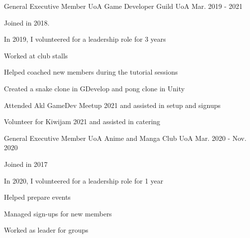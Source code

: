 

\begin{cventries}

  \cventry
    {General Executive Member} %
    {UoA Game Developer Guild} %
    {UoA} %
    {Mar. 2019 - 2021} %
    {
      \begin{cvitems} %
        \item {Joined in 2018.}
        \item {In 2019, I volunteered for a leadership role for 3 years}
        \item {Worked at club stalls}
        \item {Helped coached new members during the tutorial sessions}
        \item {Created a snake clone in GDevelop and pong clone in Unity}
        \item {Attended Akl GameDev Meetup 2021 and assisted in setup and signups}
        \item {Volunteer for Kiwijam 2021 and assisted in catering}
      \end{cvitems}
    }

  \cventry
    {General Executive Member} %
    {UoA Anime and Manga Club} %
    {UoA} %
    {Mar. 2020 - Nov. 2020} %
    {
      \begin{cvitems} %
        \item {Joined in 2017}
        \item {In 2020, I volunteered for a leadership role for 1 year}
        \item {Helped prepare events}
        \item {Managed sign-ups for new members}
        \item {Worked as leader for groups}
      \end{cvitems}
    }


\end{cventries}
